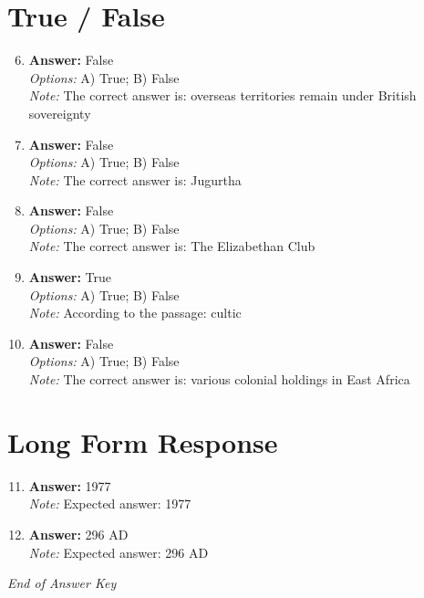 \documentclass[12pt]{article}
\begin{document}
\section*{True / False}
\begin{enumerate}[label=\arabic*.]
\setcounter{enumi}{5}
\item \textbf{Answer:} False
\\ \textit{Options:} A) True; B) False
\\ \textit{Note:} The correct answer is: overseas territories remain under British sovereignty
\item \textbf{Answer:} False
\\ \textit{Options:} A) True; B) False
\\ \textit{Note:} The correct answer is: Jugurtha
\item \textbf{Answer:} False
\\ \textit{Options:} A) True; B) False
\\ \textit{Note:} The correct answer is: The Elizabethan Club
\item \textbf{Answer:} True
\\ \textit{Options:} A) True; B) False
\\ \textit{Note:} According to the passage: cultic
\item \textbf{Answer:} False
\\ \textit{Options:} A) True; B) False
\\ \textit{Note:} The correct answer is: various colonial holdings in East Africa
\end{enumerate}

\section*{Long Form Response}
\begin{enumerate}[label=\arabic*.]
\setcounter{enumi}{10}
\item \textbf{Answer:} 1977
\\ \textit{Note:} Expected answer: 1977
\item \textbf{Answer:} 296 AD
\\ \textit{Note:} Expected answer: 296 AD
\end{enumerate}

\vfill
\noindent\textit{End of Answer Key}
\end{document}
